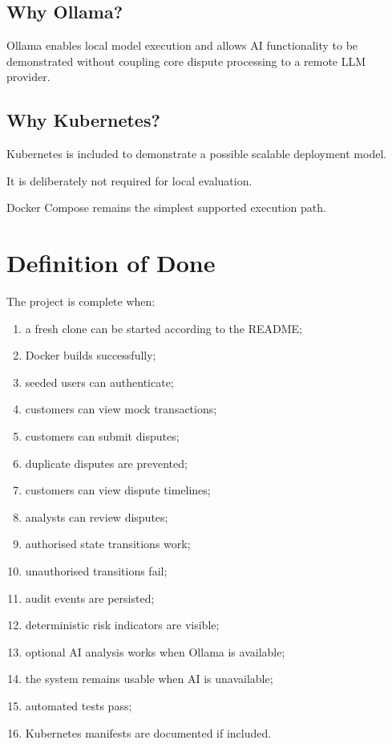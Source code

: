 \documentclass[11pt,a4paper]{article}
\begin{document}
\subsection{Why Ollama?}

Ollama enables local model execution and allows AI functionality to be
demonstrated without coupling core dispute processing to a remote LLM
provider.

\subsection{Why Kubernetes?}

Kubernetes is included to demonstrate a possible scalable deployment
model.

It is deliberately not required for local evaluation.

Docker Compose remains the simplest supported execution path.

\section{Definition of Done}

The project is complete when:

\begin{enumerate}
    \item a fresh clone can be started according to the README;
    \item Docker builds successfully;
    \item seeded users can authenticate;
    \item customers can view mock transactions;
    \item customers can submit disputes;
    \item duplicate disputes are prevented;
    \item customers can view dispute timelines;
    \item analysts can review disputes;
    \item authorised state transitions work;
    \item unauthorised transitions fail;
    \item audit events are persisted;
    \item deterministic risk indicators are visible;
    \item optional AI analysis works when Ollama is available;
    \item the system remains usable when AI is unavailable;
    \item automated tests pass;
    \item Kubernetes manifests are documented if included.
\end{enumerate}
\end{document}
